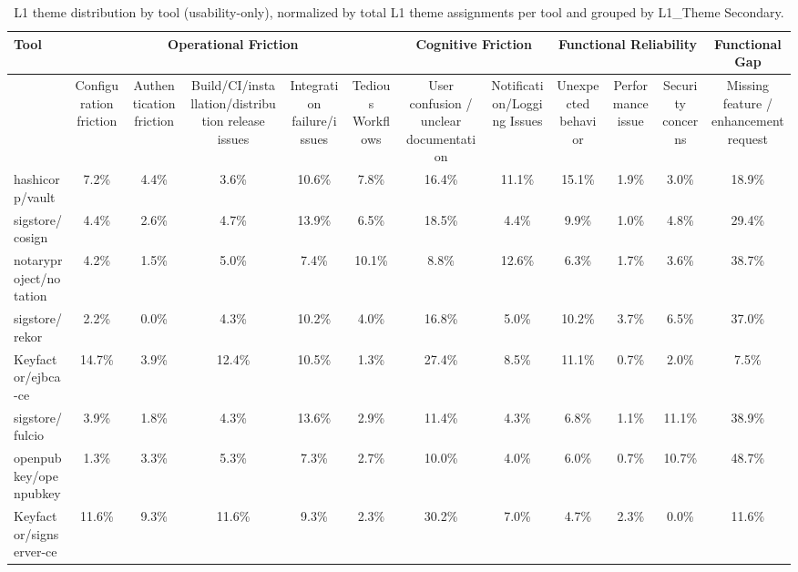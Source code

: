 \begin{table}[t]
\centering
\caption{L1 theme distribution by tool (usability-only), normalized by total L1 theme assignments per tool and grouped by L1_Theme Secondary.}
\label{tab:l1-theme-grouped-percent-by-tool}
\scriptsize
\setlength{\tabcolsep}{3pt}
\begin{tabular}{l|ccccc|cc|ccc|c}
\hline
Tool & \multicolumn{5}{c|}{Operational Friction} & \multicolumn{2}{c|}{Cognitive Friction} & \multicolumn{3}{c|}{Functional Reliability} & \multicolumn{1}{c|}{Functional Gap} \\
\hline
 & Configuration friction & Authentication friction & Build/CI/installation/distribution release issues & Integration failure/issues & Tedious Workflows & User confusion / unclear documentation & Notification/Logging Issues & Unexpected behavior & Performance issue & Security concerns & Missing feature / enhancement request \\
\hline
hashicorp/vault & 7.2\% & 4.4\% & 3.6\% & 10.6\% & 7.8\% & 16.4\% & 11.1\% & 15.1\% & 1.9\% & 3.0\% & 18.9\% \\
sigstore/cosign & 4.4\% & 2.6\% & 4.7\% & 13.9\% & 6.5\% & 18.5\% & 4.4\% & 9.9\% & 1.0\% & 4.8\% & 29.4\% \\
notaryproject/notation & 4.2\% & 1.5\% & 5.0\% & 7.4\% & 10.1\% & 8.8\% & 12.6\% & 6.3\% & 1.7\% & 3.6\% & 38.7\% \\
sigstore/rekor & 2.2\% & 0.0\% & 4.3\% & 10.2\% & 4.0\% & 16.8\% & 5.0\% & 10.2\% & 3.7\% & 6.5\% & 37.0\% \\
Keyfactor/ejbca-ce & 14.7\% & 3.9\% & 12.4\% & 10.5\% & 1.3\% & 27.4\% & 8.5\% & 11.1\% & 0.7\% & 2.0\% & 7.5\% \\
sigstore/fulcio & 3.9\% & 1.8\% & 4.3\% & 13.6\% & 2.9\% & 11.4\% & 4.3\% & 6.8\% & 1.1\% & 11.1\% & 38.9\% \\
openpubkey/openpubkey & 1.3\% & 3.3\% & 5.3\% & 7.3\% & 2.7\% & 10.0\% & 4.0\% & 6.0\% & 0.7\% & 10.7\% & 48.7\% \\
Keyfactor/signserver-ce & 11.6\% & 9.3\% & 11.6\% & 9.3\% & 2.3\% & 30.2\% & 7.0\% & 4.7\% & 2.3\% & 0.0\% & 11.6\% \\
\hline
\end{tabular}
\end{table}
